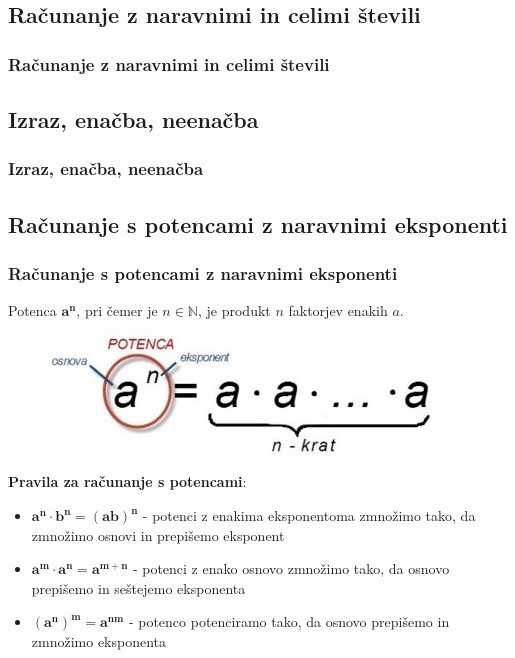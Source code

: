         \begin{frame}

        \end{frame}


    \subsection{Računanje z naravnimi in celimi števili}

        \begin{frame}
            \frametitle{Računanje z naravnimi in celimi števili}
        \end{frame}

    \subsection{Izraz, enačba, neenačba}

        \begin{frame}
            \frametitle{Izraz, enačba, neenačba}
        \end{frame}

    \subsection{Računanje s potencami z naravnimi eksponenti}

        \begin{frame}
            \frametitle{Računanje s potencami z naravnimi eksponenti}

            Potenca $\mathbf{a^n}$, pri čemer je $n \in \mathbb{N}$, je produkt $n$ faktorjev enakih $a$.

            \begin{figure}
                \includegraphics[scale=0.5]{Slike in skice/Potenca.jpg}
            \end{figure}
    
            \textbf{Pravila za računanje s potencami}:
            \begin{itemize}
                \item $\mathbf{a^n \cdot b^n = (ab)^n}$ - potenci z enakima eksponentoma zmnožimo tako, da zmnožimo osnovi in prepišemo eksponent
                \item $\mathbf{a^m \cdot a^n = a^{m+n}}$ - potenci z enako osnovo zmnožimo tako, da osnovo prepišemo in seštejemo eksponenta
                \item $\mathbf{(a^n)^m = a^{nm}}$ - potenco potenciramo tako, da osnovo prepišemo in zmnožimo eksponenta
            \end{itemize}

        \end{frame}

